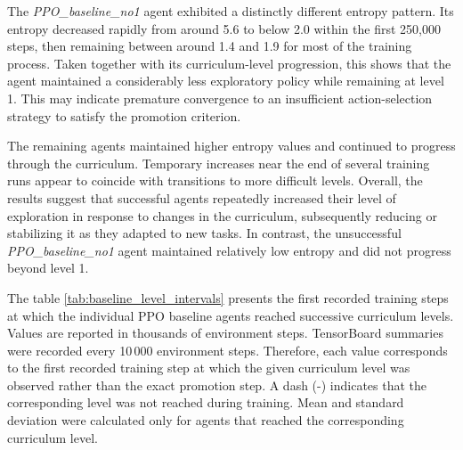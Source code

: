 \begin{table}[H]
{\begin{tabular}{
				c
				c c c c c c
				c c c c c c
			}
			\bottomrule
		\end{tabular}%
	}
	
\end{table}


The \textit{PPO\_baseline\_no1} agent exhibited a distinctly different entropy pattern. Its entropy decreased rapidly from around 5.6 to below 2.0 within the first 250,000 steps, then remaining between around 1.4 and 1.9 for most of the training process. Taken together with its curriculum-level progression, this shows that the agent maintained a considerably less exploratory policy while remaining at level 1. This may indicate premature convergence to an insufficient action-selection strategy to satisfy the promotion criterion.

The remaining agents maintained higher entropy values and continued to progress through the curriculum. Temporary increases near the end of several training runs appear to coincide with transitions to more difficult levels. Overall, the results suggest that successful agents repeatedly increased their level of exploration in response to changes in the curriculum, subsequently reducing or stabilizing it as they adapted to new tasks. In contrast, the unsuccessful \textit{PPO\_baseline\_no1} agent maintained relatively low entropy and did not progress beyond level 1.

The table \ref{tab:baseline_level_intervals} presents the first recorded training steps at which the individual PPO baseline agents reached successive curriculum levels. Values are reported in thousands of environment steps. TensorBoard summaries were recorded every 10\,000 environment steps. Therefore, each value corresponds to the first recorded training step at which the given curriculum level was observed rather than the exact promotion step. A dash (-) indicates that the corresponding level was not reached during training. Mean and standard deviation were calculated only for agents that reached the corresponding curriculum level.

